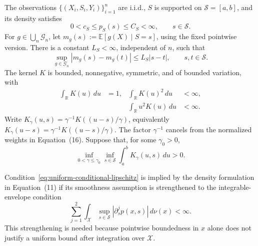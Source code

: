 \documentclass[10pt]{article}
\begin{document}
\begin{assumption}
\label{ass:kernel-regularity}
The observations \(\{(X_i,S_i,Y_i)\}_{i=1}^n\) are i.i.d.,
\(S\) is supported on \(\mathcal S=[a,b]\), and its density satisfies
\[
  0<c_S\le p_S(s)\le C_S<\infty,
  \qquad s\in\mathcal S.
\]
For \(g\in\bigcup_n\mathcal G_n\), let
\(m_g(s):=\mathbb E[g(X)\mid S=s]\), using the fixed pointwise version.
There is a constant \(L_S<\infty\), independent of \(n\), such that
\begin{equation}
  \sup_{g\in\mathcal G_n}|m_g(s)-m_g(t)|
  \le L_S|s-t|,
  \qquad s,t\in\mathcal S.
  \label{eq:uniform-conditional-lipschitz}
\end{equation}
The kernel \(K\) is bounded, nonnegative, symmetric, and of bounded
variation, with
\begin{align*}
  \int_{\mathbb R}K(u)\,du&=1,
  &\int_{\mathbb R}K(u)^2\,du&<\infty,\\
  &&\int_{\mathbb R}u^2K(u)\,du&<\infty.
\end{align*}
Write
\(K_\gamma(u,s)=\gamma^{-1}K((u-s)/\gamma)\), equivalently
\(K_\gamma(u-s)=\gamma^{-1}K((u-s)/\gamma)\).  The factor
\(\gamma^{-1}\) cancels from the normalized weights in Equation~(16).
Suppose that, for some \(\gamma_0>0\),
\begin{equation}
  \inf_{0<\gamma\le\gamma_0}\inf_{s\in\mathcal S}
  \int_a^b K_\gamma(u,s)\,du>0.
  \label{eq:one-sided-kernel-mass}
\end{equation}
\end{assumption}

Condition~\eqref{eq:uniform-conditional-lipschitz} is implied by the density
formulation in Equation~(11) if its smoothness assumption is strengthened to
the integrable-envelope condition
\begin{equation}
  \sum_{j=1}^2\int_{\mathcal X}
  \sup_{s\in\mathcal S}|\partial_s^j p(x,s)|\,d\nu(x)<\infty.
  \label{eq:density-envelope-condition}
\end{equation}
This strengthening is needed because pointwise boundedness in \(x\) alone
does not justify a uniform bound after integration over \(\mathcal X\).
\end{document}
